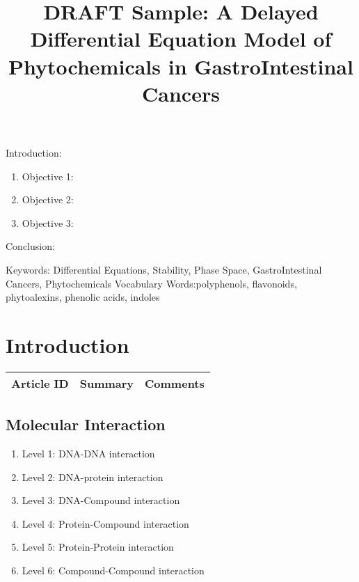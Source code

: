 

\twocolumn
\scriptsize
\begin{frontmatter}
		\title{DRAFT Sample: A Delayed Differential Equation Model of Phytochemicals in GastroIntestinal Cancers}
		\author{}
		\address{The Mathematical Learning Space}
\end{frontmatter}	

Introduction:
\begin{enumerate}
\item Objective 1:
\item Objective 2:
\item Objective 3:
\end{enumerate}
Conclusion:

Keywords: Differential Equations, Stability, Phase Space, GastroIntestinal Cancers, Phytochemicals
Vocabulary Words:polyphenols, flavonoids, phytoalexins, phenolic acids, indoles 

\section{Introduction}

\begin{table}[H]\centering
	\begin{tabular}{p{1cm}p{4cm}p{3cm}}
		Article ID & Summary & Comments\\
		\hline
		\hline
	\end{tabular}
\end{table}

\subsection{Molecular Interaction}

\begin{enumerate}
	\item Level 1: DNA-DNA interaction 
	\item Level 2: DNA-protein interaction
	\item Level 3: DNA-Compound interaction
	\item Level 4: Protein-Compound interaction 
	\item Level 5: Protein-Protein interaction 
	\item Level 6: Compound-Compound interaction 
\end{enumerate}

